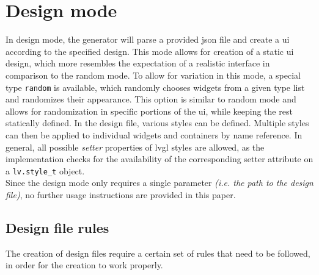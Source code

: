 \documentclass[Bachelor, BIC, english, fhCitStyle, IEEE]{BASE/twbook} %
\newcommand{\nocontentsline}[3]{}
\newcommand{\hidsubsection}[1]{\bgroup\let\addcontentsline=\nocontentsline\subsection{#1}\egroup}
\def\code#1{\texttt{#1}}
\begin{document}
\section{Design mode}
In design mode, the generator will parse a provided \ac{json} file and create a \ac{ui} according to the specified design. This mode allows for creation of a static \ac{ui} design, which more resembles the expectation of a realistic interface in comparison to the random mode. To allow for variation in this mode, a special type \code{random} is available, which randomly chooses widgets from a given type list and randomizes their appearance. This option is similar to random mode and allows for randomization in specific portions of the \ac{ui}, while keeping the rest statically defined. In the design file, various styles can be defined. Multiple styles can then be applied to individual widgets and containers by name reference. In general, all possible \textit{setter} properties of \ac{lvgl} styles are allowed, as the implementation checks for the availability of the corresponding setter attribute on a \code{lv.style\_t} object.\\
Since the design mode only requires a single parameter \textit{(i.e. the path to the design file)}, no further usage instructions are provided in this paper.
\hidsubsection{Design file rules}
The creation of design files require a certain set of rules that need to be followed, in order for the creation to work properly.
\end{document}
